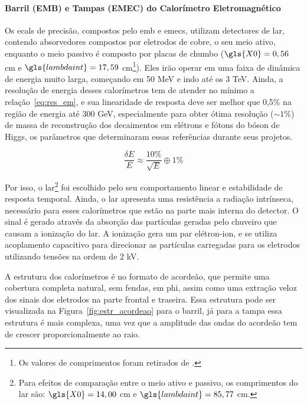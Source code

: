 \paragraph{Barril (EMB) e Tampas (EMEC) do Calorímetro Eletromagnético}
\label{par:ecal_prec}

Os \glspl{ecal} de precisão, compostos pelo \gls{emb} e \glspl{emec}, 
utilizam detectores de \gls{lar}, contendo absorvedores compostos por eletrodos 
de cobre, o seu meio ativo, enquanto o meio passivo é composto por placas de
chumbo ($\gls{X0}=0,56$ cm e $\gls{lambdaint}=17,59$ cm\footnote{Os valores de
comprimentos foram retirados de \cite{pdg_comp}.\label{fn:comp_rad_nucl}}). Eles
irão operar em uma faixa de dinâmica de energia muito larga, começando em 50 MeV
e indo até os 3 TeV. Ainda, a resolução de energia desses calorímetros tem de
atender no mínimo a relação~\ref{eq:res_em}, e sua linearidade de resposta deve ser melhor 
que 0,5\% na região de energia até 300 GeV, especialmente para obter ótima 
resolução ($\sim1\%$) de massa de reconstrução dos decaimentos em elétrons e fótons 
do bóson de Higgs, os parâmetros que determinaram essas referências durante
seus projetos. 

\begin{equation}\label{eq:res_em}
\frac{\delta E}{E} \approx \frac{10\%}{\sqrt{E}} \oplus 1\%
\end{equation}

Por isso, o \gls{lar}\footnote{Para efeitos de comparação entre o meio ativo e passivo, 
os comprimentos do \gls{lar} são: $\gls{X0}=14,00$ cm e $\gls{lambdaint}=85,77$
cm.} foi escolhido pelo seu comportamento linear e estabilidade de resposta temporal. 
Ainda, o \gls{lar} apresenta uma resistência a radiação intrínseca, necessário
para esses calorímetros que estão na parte mais interna do detector. O sinal é gerado
através da absorção das partículas geradas pelo chuveiro que causam a ionização
do \gls{lar}. A ionização gera um par elétron-ion, e se utiliza acoplamento
capacitivo para direcionar as partículas carregadas para os eletrodos
utilizando tensões na ordem de 2 kV.

A estrutura dos calorímetros é no formato de acordeão, que permite uma cobertura
completa natural, sem fendas, em \gls{phi}, assim como uma extração veloz dos sinais dos eletrodos 
na parte frontal e traseira. Essa estrutura pode ser visualizada na Figura~\ref{fig:estr_acordeao}
para o barril, já para a tampa essa estrutura é mais complexa, uma
vez que a amplitude das ondas do acordeão tem de crescer proporcionalmente ao
raio. 


